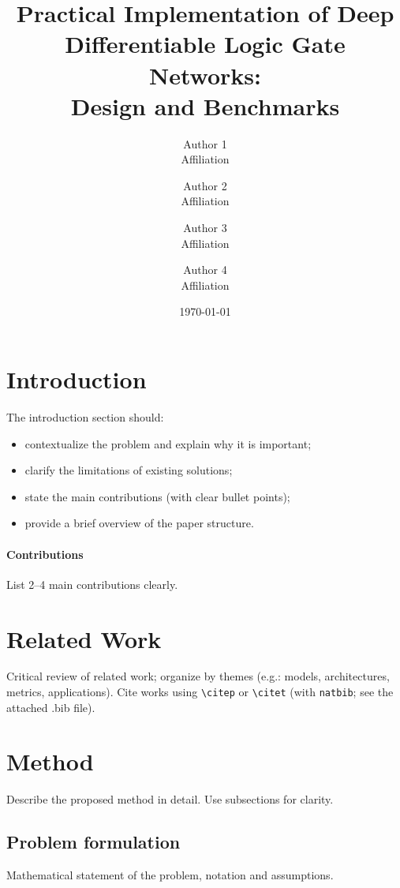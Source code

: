 \documentclass[10pt,twocolumn]{article}
\title{Practical Implementation of Deep Differentiable Logic Gate Networks:  \\
    Design and Benchmarks}
\author{
  \begin{tabular}{c}
    Author 1 \\
    Affiliation
  \end{tabular}
  \and
  \begin{tabular}{c}
    Author 2 \\
    Affiliation
  \end{tabular}
  \and
  \begin{tabular}{c}
    Author 3 \\
    Affiliation
  \end{tabular}\and
  \begin{tabular}{c}
    Author 4 \\
    Affiliation
  \end{tabular}
}
\date{\today}
\theoremstyle{definition}
\theoremstyle{plain}
\begin{document}

\section{Introduction}
The introduction section should:
\begin{itemize}[noitemsep]
  \item contextualize the problem and explain why it is important;
  \item clarify the limitations of existing solutions;
  \item state the main contributions (with clear bullet points);
  \item provide a brief overview of the paper structure.
\end{itemize}

\paragraph{Contributions} List 2--4 main contributions clearly.

\section{Related Work}
Critical review of related work; organize by themes (e.g.: models, architectures, metrics, applications).
Cite works using \verb|\citep| or \verb|\citet| (with \texttt{natbib}; see the attached .bib file).

\section{Method}
Describe the proposed method in detail.
Use subsections for clarity.

\subsection{Problem formulation}
Mathematical statement of the problem, notation and assumptions.
\end{document}
